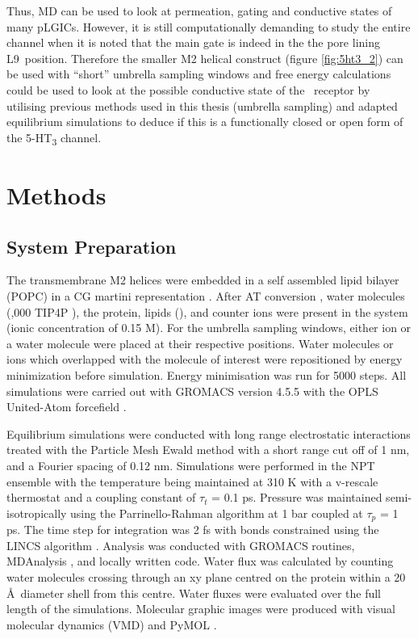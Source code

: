 Thus, MD can be used to look at permeation, gating and conductive states of many pLGICs. However, it is still computationally demanding to study the entire channel when it is noted that the main gate is indeed in the the pore lining L9\textquotesingle\ position. Therefore the smaller M2 helical construct (figure \ref{fig:5ht3_2}) can be used with  ``short'' umbrella sampling windows and free energy calculations could be used to look at the possible conductive state of the \HT\ receptor by utilising previous methods used in this thesis (umbrella sampling) and adapted equilibrium simulations to deduce if this is a functionally closed or open form of the 5-HT\textsubscript{3} channel. 

\section{Methods}

\subsection{System Preparation}

The transmembrane M2 helices were embedded in a self assembled lipid bilayer (POPC) in a CG martini representation \cite{Marrink2007}.  After AT conversion \cite{Stansfeld2011}, water molecules (,000 TIP4P \cite{Jorgensen1983}), the protein, lipids (), and counter ions were present in the system (ionic concentration of 0.15 M). For the umbrella sampling windows, either ion or a water molecule were placed at their respective positions. Water molecules or ions which overlapped with the molecule of interest were repositioned by energy minimization before simulation. Energy minimisation was run for 5000 steps. All simulations were carried out with GROMACS version 4.5.5 \cite{Berendsen1995,Hess2008} with the OPLS United-Atom forcefield \cite{Jorgensen1996}. 

Equilibrium simulations were conducted with long range electrostatic interactions treated with the Particle Mesh Ewald method \cite{Darden1993} with a short range cut off of 1 nm, and a Fourier spacing of 0.12 nm. Simulations were performed in the NPT ensemble with the temperature being maintained at 310 K with a v-rescale thermostat \cite{Bussi2007d} and a coupling constant of $\tau${$_t$} = 0.1 ps. Pressure was maintained semi-isotropically using the Parrinello-Rahman algorithm \cite{Parrinello1981a} at 1 bar coupled at $\tau${$_p$} = 1 ps. The time step for integration was 2 fs with bonds constrained using the LINCS algorithm \cite{Hess1997a}. Analysis was conducted with GROMACS routines, MDAnalysis \cite{Michaud-Agrawal2011}, and locally written code. Water flux was calculated by counting water molecules crossing through an xy plane centred on the protein within a 20 \AA\ diameter shell from this centre. Water fluxes were evaluated over the full length of the simulations.  Molecular graphic images were produced with visual molecular dynamics (VMD) \cite{Humphrey1996} and PyMOL \cite{PyMOL}.

